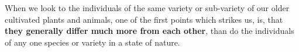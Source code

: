 When we look to the individuals of the same variety or sub-variety of our older cultivated plants and animals, one of the first points which strikes us, is, that \textbf{they generally differ much more from each other}, than do the individuals of any one species or variety in a state of nature.